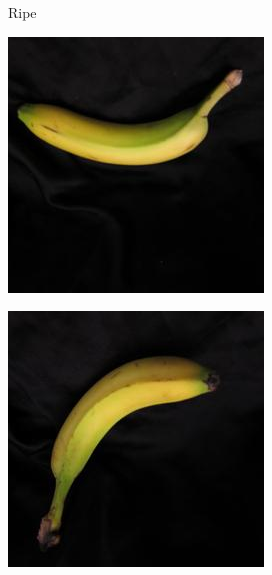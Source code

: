 \documentclass{article} %
\begin{document}
\begin{figure}[h]
\begin{subfigure}{.123\textwidth}
\captionsetup{labelformat=empty}
\caption{Ripe}
\end{subfigure}%
\qquad
 \begin{subfigure}{.123\textwidth}
  \centering
\includegraphics[width=\textwidth]{../results/q_samples/mis_ripe/PRE_2_RIPE_1.jpg}
\captionsetup{labelformat=empty}
\caption{}
\end{subfigure}%
  \begin{subfigure}{.123\textwidth}
  \centering
\includegraphics[width=\textwidth]{../results/q_samples/mis_ripe/PRE_2_RIPE_4.jpg}

\end{subfigure}
\end{figure}
\end{document}
